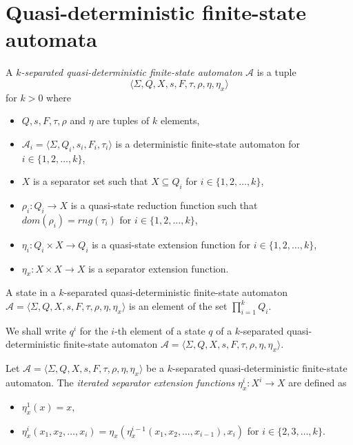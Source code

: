 \section{Quasi-deterministic finite-state automata}
\label{section:quasi_deterministic_finite_state_automata}

\begin{definition}
  A \emph{$k$-separated quasi-deterministic finite-state automaton} $\mathcal{A}$ is
  a tuple
  \begin{equation*}
    \langle \Sigma, Q, X, s, F, \tau, \rho, \eta, \eta_x \rangle
  \end{equation*}
  for $k > 0$ where
  \begin{itemize}
    \item $Q, s, F, \tau, \rho$ and $\eta$ are tuples of $k$ elements,
    \item $\mathcal{A}_i = \langle \Sigma, Q_i, s_i, F_i, \tau_i \rangle$ is a
          deterministic finite-state automaton for $i \in \{ 1, 2, \ldots, k
            \}$,
    \item $X$ is a separator set such that $X \subseteq Q_i$ for $i \in \{ 1, 2,
            \ldots, k \}$,
    \item $\rho_i : Q_i \rightarrow X$ is a quasi-state reduction function such
          that $dom(\rho_i) = rng(\tau_i)$ for $i \in \{ 1, 2, \ldots, k \}$,
    \item $\eta_i : Q_i \times X \rightarrow Q_i$ is a quasi-state extension
          function for $i \in \{ 1, 2, \ldots, k \}$,
    \item $\eta_x : X \times X \rightarrow X$ is a separator extension function.
  \end{itemize}
\end{definition}

\begin{definition}
  A state in a $k$-separated quasi-deterministic finite-state automaton $\mathcal{A}
  = \langle \Sigma, Q, X, s, F, \tau, \rho, \eta, \eta_x \rangle$ is an element of
  the set $\prod_{i=1}^k Q_i$.
\end{definition}

We shall write $q^i$ for the $i$-th element of a state $q$ of a $k$-separated
quasi-deterministic finite-state automaton $\mathcal{A} = \langle \Sigma, Q, X, s,
F, \tau, \rho, \eta, \eta_x \rangle$.

\begin{definition}
  Let $\mathcal{A} = \langle \Sigma, Q, X, s, F, \tau, \rho, \eta, \eta_x \rangle$ be
  a $k$-separated quasi-deterministic finite-state automaton. The \emph{iterated
  separator extension functions} $\eta_x^i : X^i \rightarrow X$ are defined as
  \begin{itemize}
    \item $\eta_x^1(x) = x$,
    \item $\eta_x^i(x_1, x_2, \ldots, x_i) = \eta_x(\eta_x^{i-1}(x_1, x_2, \ldots,
	    x_{i-1}), x_i)$ for $i \in \{ 2, 3, \ldots, k \}$.
  \end{itemize}
\end{definition}

